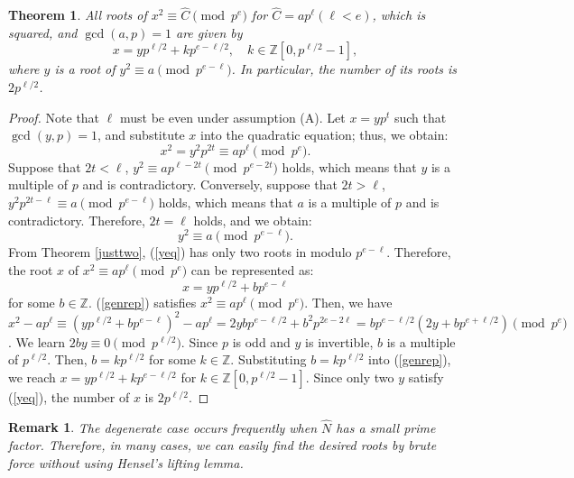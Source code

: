 \documentclass{article}
\newtheorem{thm}{Theorem}
\newtheorem{rem}{Remark}
\begin{document}
\begin{thm}\label{nonzerothm}
All roots of 
$x^2\equiv \hat{C}\pmod{p^e}$ for $\hat{C}=ap^{\ell}(\ell<e)$, 
which is squared, and $\gcd(a,p)=1$ are given by 
$$
x = yp^{\ell/2}+kp^{e-\ell/2}, \quad k\in\mathbb{Z}[0,p^{\ell/2}-1], 
$$
where $y$ is a root of $y^2\equiv a\pmod{p^{e-\ell}}$. 
In particular, the number of its roots is $2p^{\ell/2}$.
\end{thm}
\begin{proof}
Note that $\ell$ must be even under assumption (A).
Let $x=yp^t$ such that $\gcd(y,p)=1$, and substitute $x$ into the quadratic equation; thus, we obtain:
$$
x^2 = y^2p^{2t}\equiv ap^{\ell}\pmod{p^e}.
$$
Suppose that $2t<\ell$, $y^2\equiv ap^{\ell-2t}\pmod{p^{e-2t}}$ holds, 
which means that $y$ is a multiple of $p$ and is contradictory. 
Conversely, suppose that $2t>\ell$, $y^2p^{2t-\ell}\equiv a\pmod{p^{e-\ell}}$ holds, 
which means that $a$ is a multiple of $p$ and is contradictory. 
Therefore, $2t=\ell$ holds, and we obtain:
\begin{equation}\label{yeq}
y^2\equiv a\pmod{p^{e-\ell}}.
\end{equation}
From Theorem \ref{justtwo}, (\ref{yeq}) has only two roots in modulo $p^{e-\ell}$. 
Therefore, the root $x$ of $x^2\equiv ap^{\ell}\pmod{p^e}$ can be represented as: 
\begin{equation}\label{genrep}
x = yp^{\ell/2}+bp^{e-\ell}
\end{equation}
for some $b\in\mathbb{Z}$. 
(\ref{genrep}) satisfies $x^2\equiv ap^{\ell}\pmod{p^e}$. Then, we have 
$x^2-ap^{\ell}\equiv(yp^{\ell/2}+bp^{e-\ell})^2 -ap^{\ell}= 2ybp^{e-\ell/2}+b^2p^{2e-2\ell} 
=bp^{e-\ell/2}(2y+bp^{e+\ell/2})\pmod{p^e}$. 
We learn $2by\equiv 0\pmod{p^{\ell/2}}$. Since $p$ is odd and $y$ is invertible, 
$b$ is a multiple of $p^{\ell/2}$. Then, $b=kp^{\ell/2}$ for some $k\in\mathbb{Z}$.
Substituting $b=kp^{\ell/2}$ into (\ref{genrep}), we reach 
$x = yp^{\ell/2}+kp^{e-\ell/2}$ for $k\in\mathbb{Z}[0,p^{\ell/2}-1]$. 
Since only two $y$ satisfy (\ref{yeq}), the number of $x$ is $2p^{\ell/2}$.
\end{proof}

\begin{rem}
The degenerate case occurs frequently when $\hat{N}$ has a small prime factor.
Therefore, in many cases, we can easily find the desired roots by 
brute force without using Hensel's lifting lemma.
\end{rem}
\end{document}
